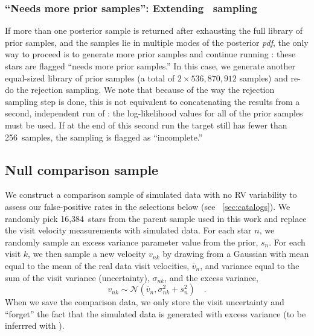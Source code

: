 \documentclass[modern, letterpaper]{aastex62}
\newcommand{\thejoker}{\project{The~Joker}}
\newcommand{\pdf}{\textit{pdf}}
\newcommand{\nprior}{536,870,912}
\newcommand{\nposterior}{256}
\newcommand{\ncontrol}{16,384}
\begin{document}
\subsubsection{``Needs more prior samples'': Extending \thejoker\ sampling}

If more than one posterior sample is returned after exhausting the full library
of prior samples, and the samples lie in multiple modes of the posterior \pdf,
the only way to proceed is to generate more prior samples and continue running
\thejoker: these stars are flagged ``needs more prior samples.''
In this case, we generate another equal-sized library of prior samples (a total
of $2\times\nprior$ samples) and re-do the rejection sampling.
We note that because of the way the rejection sampling step is done, this is not
equivalent to concatenating the results from a second, independent run of
\thejoker: the log-likelihood values for all of the prior samples must be used.
If at the end of this second run the target still has fewer than \nposterior\
samples, the sampling is flagged as ``incomplete.''

\subsection{Null comparison sample}
\label{sec:control-sample}

We construct a comparison sample of simulated data with no RV variability to
assess our false-positive rates in the selections below (see
\sectionname~\ref{sec:catalogs}).
We randomly pick \ncontrol\ stars from the parent sample used in this work and
replace the visit velocity measurements with simulated data.
For each star $n$, we randomly sample an excess variance parameter value from
the prior, $s_n$.
For each visit $k$, we then sample a new velocity $v_{nk}$ by drawing from a
Gaussian with mean equal to the mean of the real data visit velocities,
$\bar{v}_n$, and variance equal to the sum of the visit variance (uncertainty),
$\sigma_{nk}$, and the excess variance,
\begin{equation}
    v_{nk} \sim \mathcal{N}(\bar{v}_n, \sigma_{nk}^2 + s_n^2) \quad .
\end{equation}
When we save the comparison data, we only store the visit uncertainty and
``forget'' the fact that the simulated data is generated with excess variance
(to be inferrred with \thejoker).


%
\end{document}
